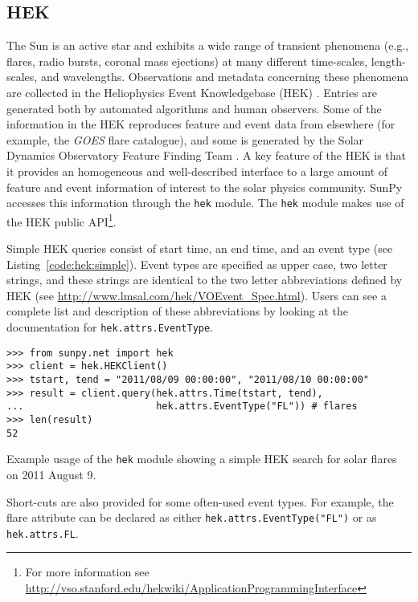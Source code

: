 \subsection{HEK}\label{ssec:hek}

The Sun is an active star and exhibits a wide range of transient phenomena 
(e.g., flares, radio bursts, coronal mass ejections) at many different time-scales, 
length-scales, and 
wavelengths. Observations and metadata concerning these phenomena are collected 
in the Heliophysics Event Knowledgebase (HEK) \citep{hek2012}.  Entries are generated both by 
automated algorithms and human observers.  Some of the information in the HEK 
reproduces feature and event data from elsewhere (for example, the \textit{GOES} flare catalogue),
and some is generated by the Solar Dynamics Observatory Feature Finding Team 
\citep{martens2012}.  A key feature of the HEK is that it
provides an homogeneous and well-described interface to a large amount of 
feature and event information of interest to the solar physics community. SunPy 
accesses this information through the \texttt{hek} module.  The \texttt{hek} module makes use of the 
HEK public API\footnote{For more information see \url{http://vso.stanford.edu/hekwiki/ApplicationProgrammingInterface}}.

Simple HEK queries consist of start time, an end time, and an event type 
(see Listing~\ref{code:hek:simple}). Event types are specified as upper case, 
two letter strings, and these strings are 
identical to the two letter abbreviations defined by HEK 
(see \url{http://www.lmsal.com/hek/VOEvent_Spec.html}). Users can see a
complete list and description of these abbreviations by looking at the documentation
for \texttt{hek.attrs.EventType}.

\begin{listing}[H]
\begin{verbatim}
>>> from sunpy.net import hek
>>> client = hek.HEKClient()
>>> tstart, tend = "2011/08/09 00:00:00", "2011/08/10 00:00:00"
>>> result = client.query(hek.attrs.Time(tstart, tend), 
...                       hek.attrs.EventType("FL")) # flares
>>> len(result)
52
\end{verbatim}
\caption{Example usage of the \texttt{hek} module showing a simple HEK search for solar flares
on 2011 August 9.}
\label{code:hek:simple}
\end{listing}

Short-cuts are also provided for some often-used event types. For example, 
the flare attribute can be declared as either 
\texttt{hek.attrs.EventType("FL")} or as \texttt{hek.attrs.FL}. 

